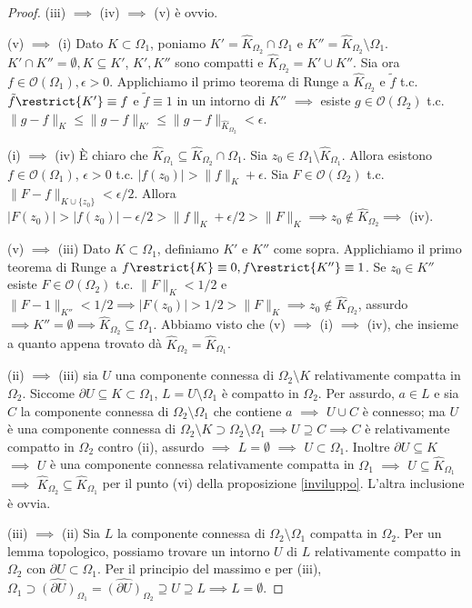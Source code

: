 \begin{proof}
  (iii) $\implies$ (iv) $\implies$ (v) è ovvio.

  (v) $\implies$ (i) Dato $K \subset \Omega_1$, poniamo $K'=\widehat{K}_{\Omega_2} \cap \Omega_1$ e $K''=\widehat{K}_{\Omega_2} \setminus \Omega_1$. $K' \cap K''=\emptyset, K \subseteq K'$, $K', K''$ sono compatti e $\widehat{K}_{\Omega_2}=K'\cup K''$.
  Sia ora $f \in \mathcal{O}(\Omega_1), \epsilon>0$. Applichiamo il primo teorema di Runge a $\widehat{K}_{\Omega_2}$ e $\tilde{f}$ t.c. $\tilde{f}\restrict{K'}\equiv f$ e $\tilde{f}\equiv 1$ in un intorno di $K''$ $\implies$ esiste $g \in \mathcal{O}(\Omega_2)$ t.c. $\|g-f\|_K \le \|g-f\|_{K'} \le \|g-f\|_{\widehat{K}_{\Omega_2}}<\epsilon$.

  (i) $\implies$ (iv) È chiaro che $\widehat{K}_{\Omega_1} \subseteq \widehat{K}_{\Omega_2} \cap \Omega_1$. Sia $z_0 \in \Omega_1 \setminus \widehat{K}_{\Omega_1}$.
  Allora esistono $f \in \mathcal{O}(\Omega_1)$, $\epsilon>0$ t.c. $|f(z_0)|>\|f\|_K+\epsilon$. Sia $F \in \mathcal{O}(\Omega_2)$ t.c. $\|F-f\|_{K \cup \{z_0\}}<\epsilon/2$.
  Allora $|F(z_0)|>|f(z_0)|-\epsilon/2>\|f\|_K+\epsilon/2>\|F\|_K \implies z_0 \not\in \widehat{K}_{\Omega_2} \implies$ (iv).

  (v) $\implies$ (iii) Dato $K \subset \Omega_1$, definiamo $K'$ e $K''$ come sopra. Applichiamo il primo teorema di Runge a $f\restrict{K} \equiv 0, f\restrict{K''}\equiv 1$.
  Se $z_0 \in K''$ esiste $F \in \mathcal{O}(\Omega_2)$ t.c. $\|F\|_K<1/2$ e $\|F-1\|_{K''}<1/2 \implies |F(z_0)|>1/2>\|F\|_K \implies z_0 \not\in \widehat{K}_{\Omega_2}$, assurdo $\implies K''=\emptyset \implies \widehat{K}_{\Omega_2} \subseteq \Omega_1$.
  Abbiamo visto che (v) $\implies$ (i) $\implies$ (iv), che insieme a quanto appena trovato dà $\widehat{K}_{\Omega_2}=\widehat{K}_{\Omega_1}$.

  (ii) $\implies$ (iii) sia $U$ una componente connessa di $\Omega_2 \setminus K$ relativamente compatta in $\Omega_2$. Siccome $\partial U \subseteq K \subset \Omega_1$, $L=U \setminus \Omega_1$ è compatto in $\Omega_2$.
  Per assurdo, $a \in L$ e sia $C$ la componente connessa di $\Omega_2 \setminus \Omega_1$ che contiene $a$ $\implies$ $U \cup C$ è connesso; ma $U$ è una componente connessa di $\Omega_2 \setminus K \supset \Omega_2 \setminus \Omega_1 \implies U \supseteq C \implies C$ è relativamente compatto in $\Omega_2$ contro (ii), assurdo $\implies$ $L=\emptyset$ $\implies$ $U \subset \Omega_1$.
  Inoltre $\partial U \subseteq K$ $\implies$ $U$ è una componente connessa relativamente compatta in $\Omega_1$ $\implies$ $U \subseteq \widehat{K}_{\Omega_1}$ $\implies$ $\widehat{K}_{\Omega_2} \subseteq \widehat{K}_{\Omega_1}$ per il punto (vi) della proposizione \ref{inviluppo}. L'altra inclusione è ovvia.

  (iii) $\implies$ (ii) Sia $L$ la componente connessa di $\Omega_2 \setminus \Omega_1$ compatta in $\Omega_2$. Per un lemma topologico, possiamo trovare un intorno $U$ di $L$ relativamente compatto in $\Omega_2$ con $\partial U \subset \Omega_1$. Per il principio del massimo e per (iii), $\Omega_1 \supset \widehat{(\partial U)}_{\Omega_1}=\widehat{(\partial U)}_{\Omega_2} \supseteq U \supseteq L \implies L=\emptyset$.
\end{proof}


